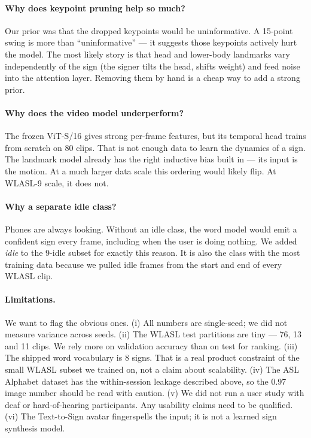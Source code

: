 \documentclass[11pt]{article}
\begin{document}
\paragraph{Why does keypoint pruning help so much?} Our prior was that the dropped keypoints would be uninformative. A 15-point swing is more than ``uninformative'' --- it suggests those keypoints actively hurt the model. The most likely story is that head and lower-body landmarks vary independently of the sign (the signer tilts the head, shifts weight) and feed noise into the attention layer. Removing them by hand is a cheap way to add a strong prior.

\paragraph{Why does the video model underperform?} The frozen ViT-S/16 gives strong per-frame features, but its temporal head trains from scratch on 80 clips. That is not enough data to learn the dynamics of a sign. The landmark model already has the right inductive bias built in --- its input is the motion. At a much larger data scale this ordering would likely flip. At WLASL-9 scale, it does not.

\paragraph{Why a separate idle class?} Phones are always looking. Without an idle class, the word model would emit a confident sign every frame, including when the user is doing nothing. We added \textit{idle} to the 9-idle subset for exactly this reason. It is also the class with the most training data because we pulled idle frames from the start and end of every WLASL clip.

\paragraph{Limitations.} We want to flag the obvious ones. (i) All numbers are single-seed; we did not measure variance across seeds. (ii) The WLASL test partitions are tiny --- 76, 13 and 11 clips. We rely more on validation accuracy than on test for ranking. (iii) The shipped word vocabulary is 8 signs. That is a real product constraint of the small WLASL subset we trained on, not a claim about scalability. (iv) The ASL Alphabet dataset has the within-session leakage described above, so the 0.97 image number should be read with caution. (v) We did not run a user study with deaf or hard-of-hearing participants. Any usability claims need to be qualified. (vi) The Text-to-Sign avatar fingerspells the input; it is not a learned sign synthesis model.
\end{document}
